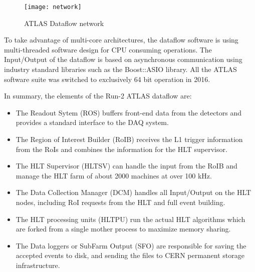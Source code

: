 \begin{figure}[t!]
\centering
\texttt{[image: network]} 
\caption{ATLAS Dataflow network}
\label{fig:net_diagram}
\end{figure} 

To take advantage of multi-core architectures, the dataflow
 software is using multi-threaded software design for CPU consuming operations.
The Input/Output of the dataflow is based on asynchronous communication using industry standard libraries
such as the Boost::ASIO library. All the ATLAS software suite was switched to exclusively 64 bit operation in 2016.



In summary, the elements of the Run-2 ATLAS dataflow are:

\begin{itemize}
\item The Readout Sytem (ROS) buffers front-end data from the detectors and provides a standard interface to the DAQ system.
\item The Region of Interest Builder (RoIB) receives the L1 trigger information from the RoIs and combines the information for the HLT supervisor.
\item The HLT Supervisor (HLTSV) can handle the input from the RoIB and manage the HLT farm of about 2000 machines at over 100 kHz.
\item The Data Collection Manager (DCM) handles all Input/Output on the HLT nodes, including RoI requests from the HLT and full event building.
\item The HLT processing units (HLTPU) run the actual HLT algorithms which 
are forked from a single mother process to maximize memory sharing.
\item The Data loggers or SubFarm Output (SFO) are responsible for saving the 
accepted events to disk, and sending the files to CERN permanent storage infrastructure.
\end{itemize}



